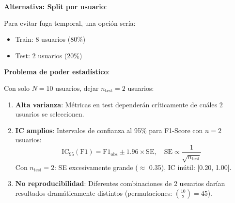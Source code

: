 \documentclass[12pt,letterpaper,twoside]{report}
\begin{document}
\begin{estadisticobox}
\textbf{Alternativa: Split por usuario}:

Para evitar fuga temporal, una opción sería:
\begin{itemize}[noitemsep]
    \item Train: 8 usuarios (80\%)
    \item Test: 2 usuarios (20\%)
\end{itemize}

\textbf{Problema de poder estadístico}:

Con solo $N=10$ usuarios, dejar $n_{\text{test}}=2$ usuarios:

\begin{enumerate}[noitemsep]
    \item \textbf{Alta varianza}: Métricas en test dependerán críticamente de cuáles 2 usuarios se seleccionen.
    
    \item \textbf{IC amplios}: Intervalos de confianza al 95\% para F1-Score con $n=2$ usuarios:
    \begin{equation}
    \text{IC}_{95}(\text{F1}) = \text{F1}_{\text{obs}} \pm 1.96 \times \text{SE}, \quad \text{SE} \propto \frac{1}{\sqrt{n_{\text{test}}}}
    \end{equation}
    Con $n_{\text{test}}=2$: SE excesivamente grande ($\approx$ 0.35), IC inútil: [0.20, 1.00].
    
    \item \textbf{No reproducibilidad}: Diferentes combinaciones de 2 usuarios darían resultados dramáticamente distintos (permutaciones: $\binom{10}{2}=45$).
\end{enumerate}
\end{estadisticobox}
\end{document}
